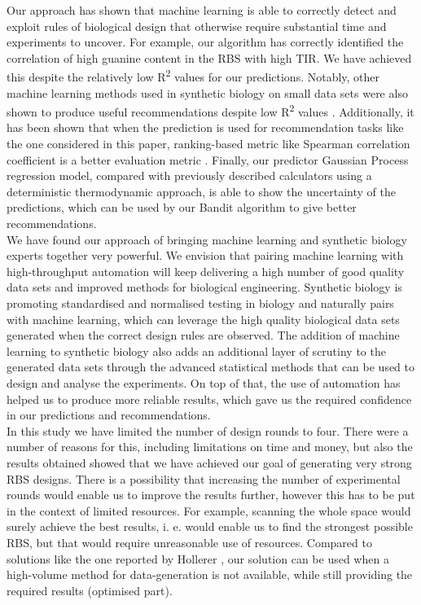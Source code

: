 \documentclass{article}
\begin{document}
Our approach has shown that machine learning is able to correctly detect and exploit rules of biological design that otherwise require substantial time and experiments to uncover.
For example, our algorithm has correctly identified the correlation of high guanine content in the RBS with high TIR.
We have achieved this despite the relatively low R\textsuperscript{2} values for our predictions.
Notably, other machine learning methods used in synthetic biology on small data sets were also shown to produce useful recommendations despite low R\textsuperscript{2} values \cite{Radivojevic2020, Opgenorth2019}.
Additionally, it has been shown that when the prediction is used for recommendation tasks like the one considered in this paper, ranking-based metric like Spearman correlation coefficient is a better evaluation metric
\cite{Schober2018,  Kang2019}.
Finally, our predictor Gaussian Process regression model, compared with previously described calculators using a deterministic thermodynamic approach, is able to show the uncertainty of the predictions, which can be used by our Bandit algorithm to give better recommendations.\\

We have found our approach of bringing machine learning and synthetic biology experts together very powerful.
We envision that pairing machine learning with high-throughput automation will keep delivering a high number of good quality data sets and improved methods for biological engineering.
Synthetic biology is promoting standardised and normalised testing in biology and naturally pairs with machine learning, which can leverage the high quality biological data sets generated when the correct design rules are observed.
The addition of machine learning to synthetic biology also adds an additional layer of scrutiny to the generated data sets through the advanced statistical methods that can be used to design and analyse the experiments.
On top of that, the use of automation has helped us to produce more reliable results, which gave us the required confidence in our predictions and recommendations.\\

In this study we have limited the number of design rounds to four.
There were a number of reasons for this, including limitations on time and money, but also the results obtained showed that we have achieved our goal of generating very strong RBS designs.
There is a possibility that increasing the number of experimental rounds would enable us to improve the results further, however this has to be put in the context of limited resources.
For example, scanning the whole space would surely achieve the best results, i. e. would enable us to find the strongest possible RBS, but that would require unreasonable use of resources.
Compared to solutions like the one reported by Hollerer \cite{Hollerer2020}, our solution can be used when a high-volume method for data-generation is not available, while still providing the required results (optimised part). \\
\end{document}

